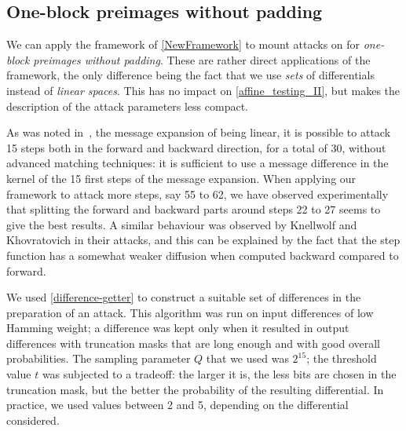 \subsection{One-block preimages without padding}
\label{sec:one_wo_pad}
  We can apply the framework of \autoref{NewFramework} to mount attacks on \shaone
  for \emph{one-block preimages without padding}. These are rather direct applications
  of the framework, the only difference being the fact that we use \emph{sets} of
  differentials instead of \emph{linear spaces}. This has no impact
  on \autoref{affine_testing_II}, but makes the description of the attack parameters
  less compact.

  As was noted in~\cite{DBLP:conf/crypto/KnellwolfK12}, the message expansion of \shaone being linear, it is possible to attack 15 steps both in the forward and backward 
  direction, for a total of 30, without advanced matching techniques: it is sufficient to use a message difference
  in the kernel of the 15 first steps of
  the message expansion. 
  When applying our framework to attack more steps, say 55 to 62, we have observed experimentally
  that splitting the forward and backward parts around steps 22 to 27 seems to give the best results.
  A similar behaviour was observed by Knellwolf and Khovratovich in their attacks, and this can be explained by the fact
  that the \shaone step function has a somewhat weaker diffusion when computed backward compared to forward.

  We used \autoref{difference-getter} to
  construct a suitable set of differences in the preparation of an attack.
  This algorithm was run on input differences of low Hamming weight; a difference 
  was kept only when it resulted in output differences
  with truncation masks that are long enough and with good overall
  probabilities. The sampling parameter $Q$ that we used was $2^{15}$;
  the threshold value $t$ was subjected to a tradeoff: the larger it is,
  the less bits are chosen in the truncation mask, but the better the probability of
  the resulting differential. In practice, we used values between 2 and 5, 
  depending on the differential considered. 

